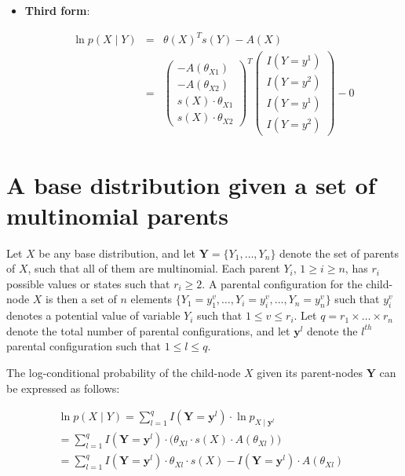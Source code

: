 \documentclass[11pt, oneside]{article}   	%
\numberwithin{figure}{section}
\numberwithin{equation}{section}
\numberwithin{table}{section}
\begin{document}
\begin{itemize}
\item \textbf{Third form}:

\begin{eqnarray*}
\ln p(X \mid Y) &=& \theta(X)^T s(Y) - A(X) \\
&=&
\begin{pmatrix}
- A(\theta_{X1}) \\
- A(\theta_{X2})\\
s(X) \cdot \theta_{X1}\\
s(X) \cdot \theta_{X2}
\end{pmatrix}^T
\begin{pmatrix}
I(Y=y^1) \\
I(Y=y^2) \\
I(Y=y^1) \\
I(Y=y^2)
\end{pmatrix}
- 0
\end{eqnarray*}

\end{itemize}

\newpage
\section{A base distribution given a set of multinomial parents}

Let $X$ be any base distribution, and let $\mathbf{Y} =\{Y_1,\ldots,Y_n\}$ denote the set of parents of $X$, such that all of them are multinomial. Each parent $Y_i$, $1 \geq i \geq n$, has $r_i$ possible values or states such that $r_i \geq 2$. A parental configuration for the child-node $X$ is then a set of $n$ elements $\{Y_1 = y_1^{v}, \ldots, Y_i = y_i^{v},\ldots, Y_n = y_n^{v} \}$ such that $y_i^{v}$ denotes a potential value of variable $Y_i$ such that  $1 \leq v \leq r_i$. Let $q = r_1 \times \ldots \times r_n$ denote the total number of parental configurations, and let $\mathbf{y}^l$ denote the $l^{th}$ parental configuration such that $1 \leq l \leq q$.

The log-conditional probability of the child-node $X$ given its parent-nodes $\mathbf{Y}$ can be expressed as follows:

\begin{eqnarray*}
\ln p(X \mid Y) =  \sum_{l=1}^q I(\mathbf{Y} =\mathbf{y}^l) \cdot \ln p_{X \mid \mathbf{y}^l} ~~~~~~~~~~~~~~~~~~~~~~~~~~~~~~~\\
= \sum_{l=1}^q I(\mathbf{Y} =\mathbf{y}^l) \cdot \Big(  \theta_{Xl}   \cdot  s(X)  \cdot  A(\theta_{Xl}) \Big)~~~~~~~~~~~~~\\
= \sum_{l=1}^q I(\mathbf{Y} =\mathbf{y}^l) \cdot \theta_{Xl} \cdot s(X) - I(\mathbf{Y} =\mathbf{y}^l) \cdot A(\theta_{Xl})
\end{eqnarray*}
\end{document}
